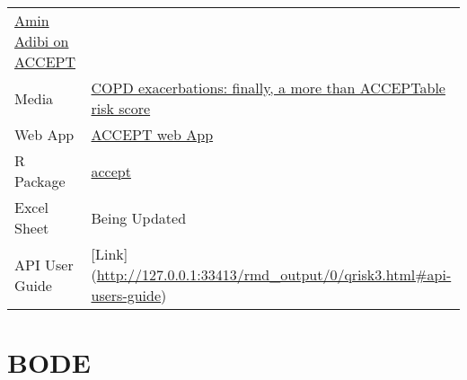 \documentclass[
]{book}
\begin{document}
\begin{longtable}[]{@{}ll@{}}
\begin{minipage}[t]{0.49\columnwidth}
\href{peermodelsnetwork.com/blog}{Amin Adibi on ACCEPT}\strut
\end{minipage}\tabularnewline
\begin{minipage}[t]{0.45\columnwidth}\raggedright
Media\strut
\end{minipage} & \begin{minipage}[t]{0.49\columnwidth}\raggedright
\href{https://doi.org/10.1016/S2213-2600(20)30049-7}{COPD exacerbations: finally, a more than ACCEPTable risk score}\strut
\end{minipage}\tabularnewline
\begin{minipage}[t]{0.45\columnwidth}\raggedright
Web App\strut
\end{minipage} & \begin{minipage}[t]{0.49\columnwidth}\raggedright
\href{http://resp.core.ubc.ca/ipress/accept}{ACCEPT web App}\strut
\end{minipage}\tabularnewline
\begin{minipage}[t]{0.45\columnwidth}\raggedright
R Package\strut
\end{minipage} & \begin{minipage}[t]{0.49\columnwidth}\raggedright
\href{https://cran.r-project.org/package=accept}{accept}\strut
\end{minipage}\tabularnewline
\begin{minipage}[t]{0.45\columnwidth}\raggedright
Excel Sheet\strut
\end{minipage} & \begin{minipage}[t]{0.49\columnwidth}\raggedright
Being Updated\strut
\end{minipage}\tabularnewline
\begin{minipage}[t]{0.45\columnwidth}\raggedright
API User Guide\strut
\end{minipage} & \begin{minipage}[t]{0.49\columnwidth}\raggedright
{[}Link{]} (\url{http://127.0.0.1:33413/rmd_output/0/qrisk3.html\#api-users-guide})\strut
\end{minipage}\tabularnewline
\bottomrule
\end{longtable}

\hypertarget{bode}{%
\chapter{BODE}\label{bode}}
\end{document}
